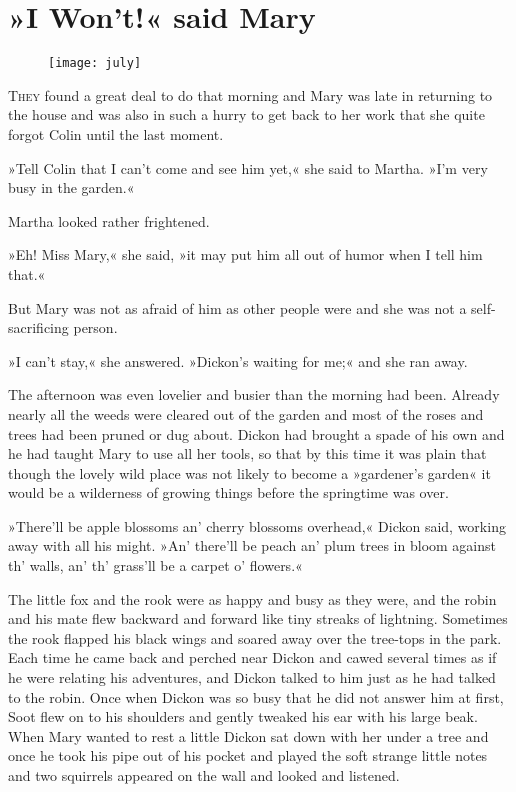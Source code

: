 \chapter{»I Won't!« said Mary} 
	
\begin{figure}[t!]
\centering
\texttt{[image: july]}
\end{figure}

	\lettrine[lines=6]{T}{hey} found a great deal to do that morning and Mary was late in returning to the house and was also in such a hurry to get back to her work that she quite forgot Colin until the last moment.

\zz
»Tell Colin that I can't come and see him yet,« she said to Martha. »I'm very busy in the garden.«

Martha looked rather frightened.

»Eh! Miss Mary,« she said, »it may put him all out of humor when I tell him that.«

But Mary was not as afraid of him as other people were and she was not a self-sacrificing person.

»I can't stay,« she answered. »Dickon's waiting for me;« and she ran away.

The afternoon was even lovelier and busier than the morning had been. Already nearly all the weeds were cleared out of the garden and most of the roses and trees had been pruned or dug about. Dickon had brought a spade of his own and he had taught Mary to use all her tools, so that by this time it was plain that though the lovely wild place was not likely to become a »gardener's garden« it would be a wilderness of growing things before the springtime was over.

»There'll be apple blossoms an' cherry blossoms overhead,« Dickon said, working away with all his might. »An' there'll be peach an' plum trees in bloom against th' walls, an' th' grass'll be a carpet o' flowers.«

The little fox and the rook were as happy and busy as they were, and the robin and his mate flew backward and forward like tiny streaks of lightning. Sometimes the rook flapped his black wings and soared away over the tree-tops in the park. Each time he came back and perched near Dickon and cawed several times as if he were relating his adventures, and Dickon talked to him just as he had talked to the robin. Once when Dickon was so busy that he did not answer him at first, Soot flew on to his shoulders and gently tweaked his ear with his large beak. When Mary wanted to rest a little Dickon sat down with her under a tree and once he took his pipe out of his pocket and played the soft strange little notes and two squirrels appeared on the wall and looked and listened.

